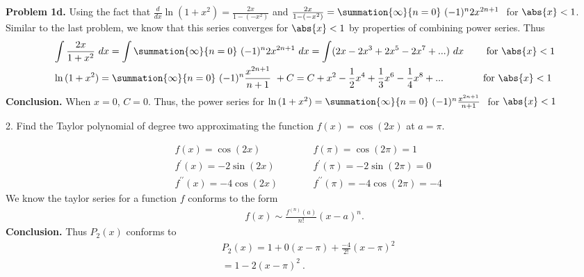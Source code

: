 \documentclass{report}
\begin{document}
    \bigbreak \noindent
    \textbf{Problem 1d.} Using the fact that $\frac{d}{dx}\ln{(1+x^{2})} = \frac{2x}{1-(-x^{2})}$ and $\frac{2x}{1-(-x^{2})} = \summation{\infty}{n=0}\ (-1)^{n}2x^{2n+1}\ $ for $\abs{x} < 1 $. Similar to the last problem, we know that this series converges for $\abs{x} < 1 $ by properties of combining power series. Thus
    \begin{equation}
    \begin{alignedat}{2}
        &\int \frac{2x}{1+x^{2}}\ dx = \int \summation{\infty}{n=0}\ (-1)^{n}2x^{2n+1}\ dx  = \int (2x-2x^{3}+2x^{5}-2x^{7} + ...)\ dx \quad \quad &&\text{ for } \abs{x} < 1 \\
        &\ln{(1+x^{2})} = \summation{\infty}{n=0}\ (-1)^{n}\frac{x^{2n+1}}{n+1}\  + C =  C + x^{2} - \frac{1}{2}x^{4}+\frac{1}{3}x^{6} -\frac{1}{4}x^{8} + ... \quad \quad &&\text{for } \abs{x} < 1
    \end{alignedat}
    \end{equation}
    \bigbreak \noindent 
    \textbf{Conclusion.} When $x=0 $, $C=0 $. Thus, the power series for $\ln{(1+x^{2})}  = \summation{\infty}{n=0}\ (-1)^{n}\frac{x^{2n+1}}{n+1}\ $ for $\abs{x} < 1 $

    \pagebreak 
    \begin{mdframed}
        2. Find the Taylor polynomial of degree two approximating the function \( f(x) = \cos(2x) \) at \( a = \pi \).
    \end{mdframed}
    \bigbreak \noindent 
    \begin{equation}
    \begin{alignedat}{2}
        &f(x) = \cos{(2x)} \quad \quad &&f(\pi) = \cos{(2\pi)} = 1 \\
        &f^{\prime}(x) = -2\sin{(2x)} \quad \quad &&f^{\prime}(\pi) = -2\sin{(2\pi)} = 0 \\
        &f^{\prime\prime}(x) = -4\cos{(2x)} \quad \quad &&f^{\prime\prime}(\pi) = -4\cos{(2\pi)} = -4
    \end{alignedat}
    \end{equation}
    We know the taylor series for a function $f$ conforms to the form
    \begin{align*}
        f(x) \sim \frac{f^{(n)}(a)}{n!}(x-a)^{n}
    .\end{align*}
    \bigbreak \noindent 
        \textbf{Conclusion.} Thus $P_{2}(x)$ conforms to 
    \begin{align*}
       &P_{2}(x) = 1 + 0(x-\pi) + \frac{-4}{2!}(x-\pi)^{2} \\
       &=1-2(x-\pi)^{2}\ 
    .\end{align*}
\end{document}
